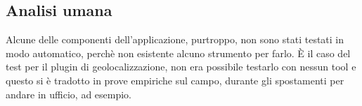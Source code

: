 \subsection{Analisi umana}
Alcune delle componenti dell'applicazione, purtroppo, non sono stati testati in modo automatico, perchè non esistente alcuno strumento per
farlo. È il caso del test per il plugin di geolocalizzazione, non era possibile testarlo con nessun tool e questo si è tradotto in prove
empiriche sul campo, durante gli spostamenti per andare in ufficio, ad esempio.